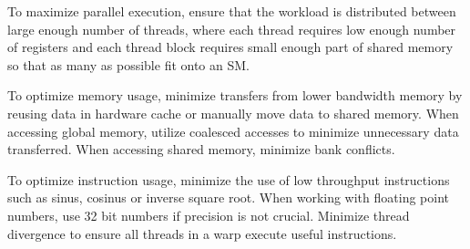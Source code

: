 To maximize parallel execution, ensure that the workload is distributed between large enough number of threads, where each thread requires low enough number of registers and each thread block requires small enough part of shared memory so that as many as possible fit onto an SM.

To optimize memory usage, minimize transfers from lower bandwidth memory by reusing data in hardware cache or manually move data to shared memory. When accessing global memory, utilize coalesced accesses to minimize unnecessary data transferred. When accessing shared memory, minimize bank conflicts.

To optimize instruction usage, minimize the use of low throughput instructions such as sinus, cosinus or inverse square root. When working with floating point numbers, use 32 bit numbers if precision is not crucial. Minimize thread divergence to ensure all threads in a warp execute useful instructions.








